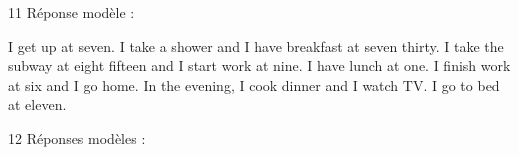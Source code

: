 \begin{corrige}{11}
Réponse modèle :
\begin{anglais}
\begin{tcolorbox}[otBase,colback=otGreenTint,colframe=otGreenTint,fontupper=\fontsize{10.4}{14}\selectfont]
I get up at seven. I take a shower and I have breakfast at seven thirty. I take the subway at
eight fifteen and I start work at nine. I have lunch at one. I finish work at six and I go home.
In the evening, I cook dinner and I watch TV. I go to bed at eleven.
\end{tcolorbox}
\end{anglais}
\end{corrige}

\begin{corrige}{12}
Réponses modèles :
\begin{reponses}[1]
\item {}
\item {}
\item {}
\item {}
\item {}
\end{reponses}
\end{corrige}

\begin{corrigetest}
\begin{reponses}[5][french]
\item {}
\item {}
\item {}
\item {}
\item {}
\item {}
\item {}
\item {}
\item {}
\item {}
\end{reponses}
\end{corrigetest}

